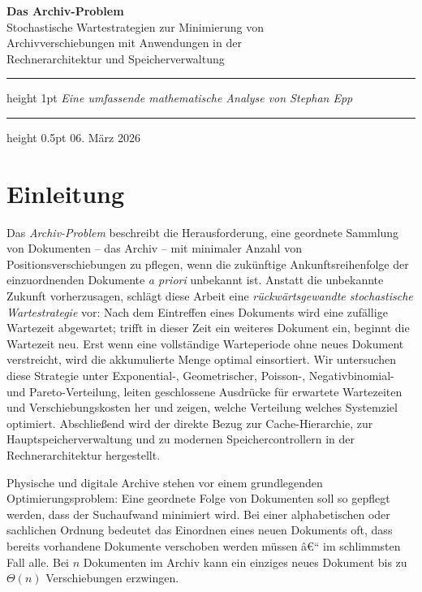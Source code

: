 ﻿\documentclass[12pt, a4paper]{article}
\begin{document}
\begin{titlepage}
  \centering
  \vspace*{2cm}
  {\LARGE\bfseries Das Archiv-Problem\\[0.4em]}
  {\large Stochastische Wartestrategien zur Minimierung von\\
          Archivverschiebungen mit Anwendungen in der\\
          Rechnerarchitektur und Speicherverwaltung\\[2.5em]}
  \hrule height 1pt
  \vspace{1.5em}
  {\large\itshape Eine umfassende mathematische Analyse von Stephan Epp\\[1em]}
  \hrule height 0.5pt
  \vfill
  {\large 06. März 2026}
\end{titlepage}
\newpage

\tableofcontents
\newpage

\section{Einleitung}\label{sec:intro}
Das \emph{Archiv-Problem} beschreibt die Herausforderung, eine geordnete
Sammlung von Dokumenten -- das Archiv -- mit minimaler Anzahl von
Positionsverschiebungen zu pflegen, wenn die zukünftige Ankunftsreihenfolge
der einzuordnenden Dokumente \emph{a priori} unbekannt ist.
Anstatt die unbekannte Zukunft vorherzusagen, schlägt diese Arbeit eine
\emph{rückwärtsgewandte stochastische Wartestrategie} vor: Nach dem Eintreffen
eines Dokuments wird eine zufällige Wartezeit abgewartet; trifft in dieser Zeit
ein weiteres Dokument ein, beginnt die Wartezeit neu. Erst wenn eine
vollständige Warteperiode ohne neues Dokument verstreicht, wird die akkumulierte
Menge optimal einsortiert. Wir untersuchen diese Strategie unter Exponential-,
Geometrischer, Poisson-, Negativbinomial- und Pareto-Verteilung, leiten
geschlossene Ausdrücke für erwartete Wartezeiten und Verschiebungskosten her
und zeigen, welche Verteilung welches Systemziel optimiert. Abschließend wird
der direkte Bezug zur Cache-Hierarchie, zur Hauptspeicherverwaltung und zu
modernen Speichercontrollern in der Rechnerarchitektur hergestellt.

Physische und digitale Archive stehen vor einem grundlegenden
Optimierungsproblem: Eine geordnete Folge von Dokumenten soll so gepflegt
werden, dass der Suchaufwand minimiert wird. Bei einer alphabetischen oder
sachlichen Ordnung bedeutet das Einordnen eines neuen Dokuments oft, dass
bereits vorhandene Dokumente verschoben werden müssen â€“ im schlimmsten Fall
alle. Bei $n$ Dokumenten im Archiv kann ein einziges neues Dokument bis zu
$\Theta(n)$ Verschiebungen erzwingen.
\end{document}
